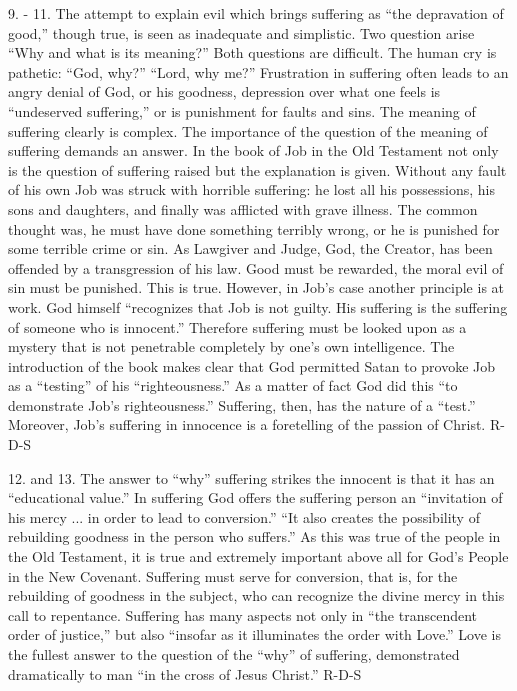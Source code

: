 \documentclass[oneside]{book}
\begin{document}
9. - 11. The attempt to explain evil which brings suffering as ``the depravation
of good,'' though true, is seen as inadequate and simplistic. Two question arise
``Why and what is its meaning?'' Both questions are difficult. The human cry is
pathetic: ``God, why?'' ``Lord, why me?'' Frustration in suffering often leads
to an angry denial of God, or his goodness, depression over what one feels is
``undeserved suffering,'' or is punishment for faults and sins. The meaning of
suffering clearly is complex. The importance of the question of the meaning of
suffering demands an answer. In the book of Job in the Old Testament not only is
the question of suffering raised but the explanation is given. Without any fault
of his own Job was struck with horrible suffering: he lost all his possessions,
his sons and daughters, and finally was afflicted with grave illness. The common
thought was, he must have done something terribly wrong, or he is punished for
some terrible crime or sin. As Lawgiver and Judge, God, the Creator, has been
offended by a transgression of his law. Good must be rewarded, the moral evil of
sin must be punished. This is true. However, in Job's case another principle is
at work. God himself ``recognizes that Job is not guilty. His suffering is the
suffering of someone who is innocent.'' Therefore suffering must be looked upon
as a mystery that is not penetrable completely by one's own intelligence. The
introduction of the book makes clear that God permitted Satan to provoke Job as
a ``testing'' of his ``righteousness.'' As a matter of fact God did this ``to
demonstrate Job's righteousness.'' Suffering, then, has the nature of a
``test.'' Moreover, Job's suffering in innocence is a foretelling of the passion
of Christ.
R-D-S

12. and 13. The answer to ``why'' suffering strikes the innocent is that it has
an ``educational value.'' In suffering God offers the suffering person an
``invitation of his mercy ... in order to lead to conversion.'' ``It also
creates the possibility of rebuilding goodness in the person who suffers.'' As
this was true of the people in the Old Testament, it is true and extremely
important above all for God's People in the New Covenant. Suffering must serve
for conversion, that is, for the rebuilding of goodness in the subject, who can
recognize the divine mercy in this call to repentance.  Suffering has many
aspects not only in ``the transcendent order of justice,'' but also ``insofar as
it illuminates the order with Love.'' Love is the fullest answer to the question
of the ``why'' of suffering, demonstrated dramatically to man ``in the cross of
Jesus Christ.''
R-D-S
\end{document}
